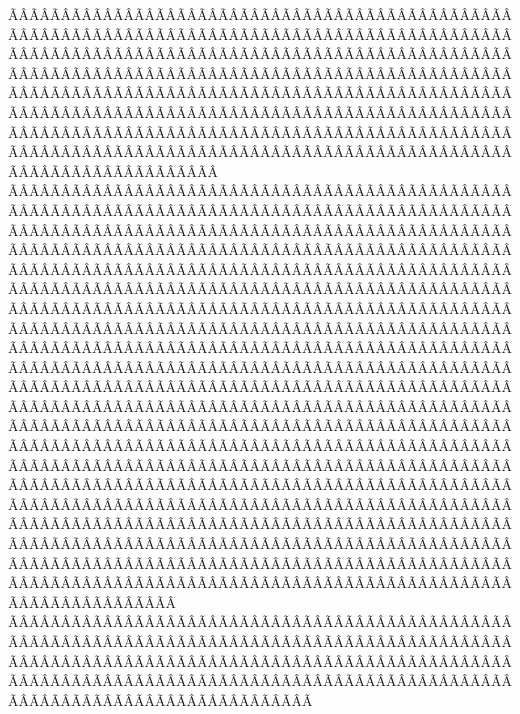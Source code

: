 \begin{sumilla}
\begin{fundamentacion}
ÃÂÃÂÃÂÃÂÃÂÃÂÃÂÃÂÃÂÃÂÃÂÃÂÃÂÃÂÃÂÃÂÃÂÃÂÃÂÃÂÃÂÃÂÃÂÃÂÃÂÃÂÃÂÃÂÃÂÃÂÃÂÃÂÃÂÃÂÃÂÃÂÃÂÃÂÃÂÃÂÃÂÃÂÃÂÃÂÃÂÃÂÃÂÃÂÃÂÃÂÃÂÃÂÃÂÃÂÃÂÃÂÃÂÃÂÃÂÃÂÃÂÃÂÃÂÃÂÃÂÃÂÃÂÃÂÃÂÃÂÃÂÃÂÃÂÃÂÃÂÃÂÃÂÃÂÃÂÃÂÃÂÃÂÃÂÃÂÃÂÃÂÃÂÃÂÃÂÃÂÃÂÃÂÃÂÃÂÃÂÃÂÃÂÃÂÃÂÃÂÃÂÃÂÃÂÃÂÃÂÃÂÃÂÃÂÃÂÃÂÃÂÃÂÃÂÃÂÃÂÃÂÃÂÃÂÃÂÃÂÃÂÃÂÃÂÃÂÃÂÃÂÃÂÃÂÃÂÃÂÃÂÃÂÃÂÃÂÃÂÃÂÃÂÃÂÃÂÃÂÃÂÃÂÃÂÃÂÃÂÃÂÃÂÃÂÃÂÃÂÃÂÃÂÃÂÃÂÃÂÃÂÃÂÃÂÃÂÃÂÃÂÃÂÃÂÃÂÃÂÃÂÃÂÃÂÃÂÃÂÃÂÃÂÃÂÃÂÃÂÃÂÃÂÃÂÃÂÃÂÃÂÃÂÃÂÃÂÃÂÃÂÃÂÃÂÃÂÃÂÃÂÃÂÃÂÃÂÃÂÃÂÃÂÃÂÃÂÃÂÃÂÃÂÃÂÃÂÃÂÃÂÃÂÃÂÃÂÃÂÃÂÃÂÃÂÃÂÃÂÃÂÃÂÃÂÃÂÃÂÃÂÃÂÃÂÃÂÃÂÃÂÃÂÃÂÃÂÃÂÃÂÃÂÃÂÃÂÃÂÃÂÃÂÃÂÃÂÃÂÃÂÃÂÃÂÃÂÃÂÃÂÃÂÃÂÃÂÃÂÃÂÃÂÃÂÃÂÃÂÃÂÃÂÃÂÃÂÃÂÃÂÃÂÃÂÃÂÃÂÃÂÃÂÃÂÃÂÃÂÃÂÃÂÃÂÃÂÃÂÃÂÃÂÃÂÃÂÃÂÃÂÃÂÃÂÃÂÃÂÃÂÃÂÃÂÃÂÃÂÃÂÃÂÃÂÃÂÃÂÃÂÃÂÃÂÃÂÃÂÃÂÃÂÃÂÃÂÃÂÃÂÃÂÃÂÃÂÃÂÃÂÃÂÃÂÃÂÃÂÃÂÃÂÃÂÃÂÃÂÃÂÃÂÃÂÃÂÃÂÃÂÃÂÃÂÃÂÃÂÃÂÃÂÃÂÃÂÃÂÃÂÃÂÃÂÃÂÃÂÃÂÃÂÃÂÃÂÃÂÃÂÃÂÃÂÃÂÃÂÃÂÃÂÃÂÃÂÃÂÃÂÃÂÃÂÃÂÃÂÃÂÃÂÃÂÃÂÃÂÃÂÃÂÃÂÃÂÃÂÃÂÃÂÃÂÃÂÃÂÃÂÃÂÃÂÃÂÃÂÃÂÃÂÃÂÃÂÃÂÃÂÃÂÃÂÃÂÃÂÃÂÃÂÃÂÃÂÃÂÃÂÃÂÃÂÃÂÃÂÃÂÃÂÃÂÃÂÃÂÃÂÃÂÃÂÃÂÃÂÃÂÃÂÃÂÃÂÃÂÃÂÃÂÃÂÃÂÃÂÃÂÃÂÃÂÃÂÃÂÃÂÃÂÃÂÃÂÃÂÃÂÃÂÃÂÃÂÃÂÃÂÃÂÃÂÃÂÃÂÃÂÃÂÃÂÃÂÃÂÃÂÃÂÃÂÃÂÃÂÃÂÃÂÃÂÃÂÃÂÃÂÃÂÃÂÃÂÃÂÃÂÃÂÃÂÃÂÃÂÃÂÃÂÃÂÃÂÃÂÃÂÃÂÃÂÃÂÃÂÃÂÃÂÃÂÃÂÃÂÃÂÃÂÃÂÃÂÃÂÃÂÃÂÃÂÃÂÃÂÃÂÃÂÃÂÃÂÃÂÃÂÃÂÃÂÃÂÃÂÃÂÃÂÃÂÃÂÃÂÃÂÃÂÃÂÃÂÃÂÃÂÃÂÃÂÃÂÃÂÃÂÃÂÃÂÃÂÃÂÃÂÃÂÃÂÃÂÃÂÃÂÃÂÃÂÃÂÃÂÃÂÃÂÃÂÃÂÃÂÃÂÃÂÃÂÃÂÃÂÃÂÃÂÃÂÃÂÃÂÃÂÃÂÃÂÃÂÃÂÃÂÃÂÃÂÃÂÃÂÃÂÃÂÃÂÃÂÃÂÃÂÃÂÃÂÃÂÃÂÃÂÃÂÃÂÃÂÃÂÃÂÃÂÃÂÃÂÃÂÃÂÃÂÃÂÃÂÃÂÃÂÃÂÃÂÃÂÃÂÃÂÃÂÃÂÃÂÃÂÃÂÃÂÃÂÃÂÃÂÃÂÃÂÃÂÃÂÃÂÃÂÃÂÃÂÃÂÃÂÃÂÃÂÃÂÃÂÃÂÃÂÃÂÃÂÃÂÃÂÃÂÃÂÃÂÃÂÃÂÃÂÃÂÃÂÃÂÃÂÃÂÃÂÃÂÃÂÃÂÃÂÃÂÃÂÃÂÃÂÃÂÃÂÃÂÃÂÃÂÃÂÃÂÃÂÃÂÃÂÃÂÃÂÃÂÃÂÃÂÃÂÃÂÃÂÃÂÃÂÃÂÃÂÃÂÃÂÃÂÃÂÃÂÃÂÃÂÃÂÃÂÃÂÃÂÃÂÃÂÃÂÃÂÃÂÃÂÃÂÃÂÃÂÃÂÃÂÃÂÃÂÃÂÃÂÃÂÃÂÃÂÃÂÃÂÃÂÃÂÃÂÃÂÃÂÃÂÃÂÃÂÃÂÃÂÃÂÃÂÃÂÃÂÃÂÃÂÃÂÃÂÃÂÃÂÃÂÃÂÃÂÃÂÃÂÃÂÃÂÃÂÃÂÃÂÃÂÃÂÃÂÃÂÃÂÃÂÃÂÃÂÃÂÃÂÃÂÃÂÃÂÃÂÃÂÃÂÃÂÃÂÃÂÃÂÃÂÃÂÃÂÃÂÃÂÃÂÃÂÃÂÃÂÃÂÃÂÃÂÃÂÃÂÃÂÃÂÃÂÃÂÃÂÃÂÃÂÃÂÃÂÃÂÃÂÃÂÃÂÃÂÃÂÃÂÃÂÃÂÃÂÃÂÃÂÃÂÃÂÃÂÃÂÃÂÃÂÃÂÃÂÃÂÃÂÃÂÃÂÃÂÃÂÃÂÃÂÃÂÃÂÃÂÃÂÃÂÃÂÃÂÃÂÃÂÃÂÃÂÃÂÃÂÃÂÃÂÃÂÃÂÃÂÃÂÃÂÃÂÃÂÃÂÃÂÃÂÃÂÃÂÃÂÃÂÃÂÃÂÃÂÃÂÃÂÃÂÃ
\end{fundamentacion}
\end{sumilla}
